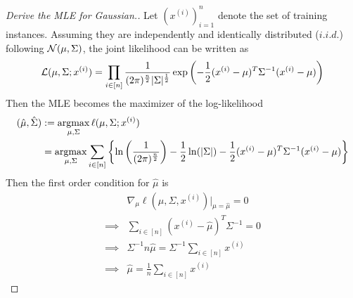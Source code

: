 \documentclass{report}
\begin{document}
\begin{example}
            \begin{proof}[Derive the MLE for Gaussian.]
                Let $\left( x^{(i)} \right)_{i=1}^n$ denote the set of training instances. Assuming they are independently and identically distributed ($i.i.d.$) following $\mathcal{{N}}(\mu, \Sigma)$, the joint likelihood can be written as
                \begin{equation}
                    \mathcal{{L}}(\mu, \Sigma; x^{(i)}) = \prod_{i \in [n]} \frac{1}{(2\pi)^{\frac{n}{2}} |\Sigma|^{\frac{1}{2}}}
                    \exp \left (
                        - \frac{1}{2} (x^{(i)} - \mu)^T \Sigma^{-1} (x^{(i)} - \mu)
                    \right )
                \end{equation}
                Then the MLE becomes the maximizer of the log-likelihood
                \begin{align}
                    (\hat{\mu}, \hat{\Sigma}) &:= \operatorname*{argmax}_{\mu, \Sigma} \ell(\mu, \Sigma; x^{(i)}) \\
                    &= \operatorname*{argmax}_{\mu, \Sigma} \sum_{i \in [n]} \left \{ 
                    \ln \left (
                        \frac{1}{(2\pi)^{\frac{n}{2}}} \right)
                    - \frac{1}{2} \ln (|\Sigma|)
                    - \frac{1}{2} (x^{(i)} - \mu)^T \Sigma^{-1} (x^{(i)} - \mu)
                    \right \}
                \end{align}
                Then the first order condition for $\hat{\mu}$ is 
                \begin{align}
                    &\nabla_\mu \ell(\mu, \Sigma, x^{(i)})|_{\mu = \hat{\mu}} = 0 \\
                    \implies& \sum_{i \in [n]} (x^{(i)} - \hat{\mu})^T \Sigma^{-1} = 0 \\
                    \implies& \Sigma^{-1} n \hat{\mu} = \Sigma^{-1} \sum_{i \in [n]} x^{(i)} \\
                    \implies& \hat{\mu} = \frac{1}{n} \sum_{i \in [n]} x^{(i)}
                \end{align}
                

\end{proof}
\end{example}
\end{document}

